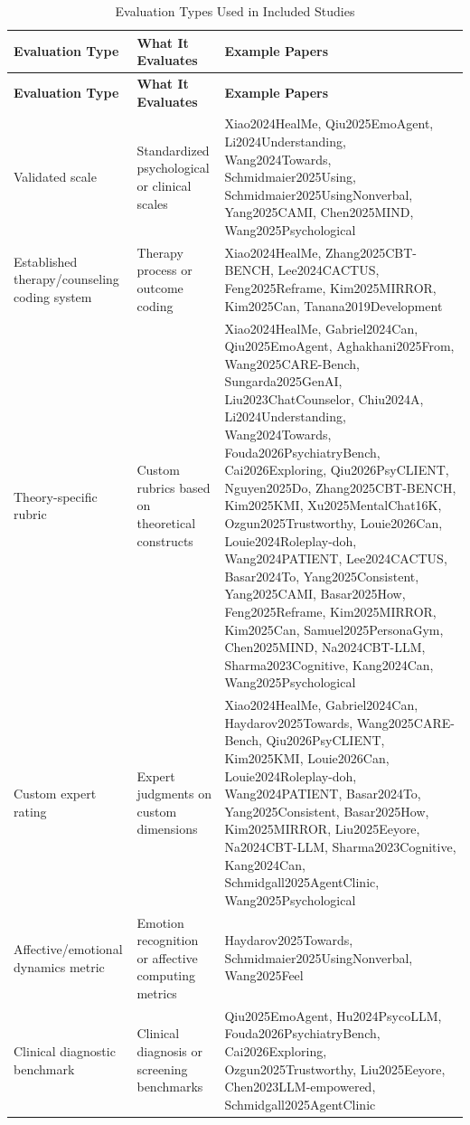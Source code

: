 \begin{longtable}{p{4cm}p{5cm}p{6cm}}
\caption{Evaluation Types Used in Included Studies}
\label{tab:eval-types} \\
\toprule
\textbf{Evaluation Type} & \textbf{What It Evaluates} & \textbf{Example Papers} \\
\midrule
\endfirsthead

\toprule
\textbf{Evaluation Type} & \textbf{What It Evaluates} & \textbf{Example Papers} \\
\midrule
\endhead

\bottomrule
\endfoot
\hyphenpenalty=10000\exhyphenpenalty=10000\tolerance=10000\raggedright
Validated scale & Standardized psychological or clinical scales & Xiao2024HealMe, Qiu2025EmoAgent, Li2024Understanding, Wang2024Towards, Schmidmaier2025Using, Schmidmaier2025UsingNonverbal, Yang2025CAMI, Chen2025MIND, Wang2025Psychological \\
Established therapy/counseling coding system & Therapy process or outcome coding & Xiao2024HealMe, Zhang2025CBT-BENCH, Lee2024CACTUS, Feng2025Reframe, Kim2025MIRROR, Kim2025Can, Tanana2019Development \\
Theory-specific rubric & Custom rubrics based on theoretical constructs & Xiao2024HealMe, Gabriel2024Can, Qiu2025EmoAgent, Aghakhani2025From, Wang2025CARE-Bench, Sungarda2025GenAI, Liu2023ChatCounselor, Chiu2024A, Li2024Understanding, Wang2024Towards, Fouda2026PsychiatryBench, Cai2026Exploring, Qiu2026PsyCLIENT, Nguyen2025Do, Zhang2025CBT-BENCH, Kim2025KMI, Xu2025MentalChat16K, Ozgun2025Trustworthy, Louie2026Can, Louie2024Roleplay-doh, Wang2024PATIENT, Lee2024CACTUS, Basar2024To, Yang2025Consistent, Yang2025CAMI, Basar2025How, Feng2025Reframe, Kim2025MIRROR, Kim2025Can, Samuel2025PersonaGym, Chen2025MIND, Na2024CBT-LLM, Sharma2023Cognitive, Kang2024Can, Wang2025Psychological \\
Custom expert rating & Expert judgments on custom dimensions & Xiao2024HealMe, Gabriel2024Can, Haydarov2025Towards, Wang2025CARE-Bench, Qiu2026PsyCLIENT, Kim2025KMI, Louie2026Can, Louie2024Roleplay-doh, Wang2024PATIENT, Basar2024To, Yang2025Consistent, Basar2025How, Kim2025MIRROR, Liu2025Eeyore, Na2024CBT-LLM, Sharma2023Cognitive, Kang2024Can, Schmidgall2025AgentClinic, Wang2025Psychological \\
Affective/emotional dynamics metric & Emotion recognition or affective computing metrics & Haydarov2025Towards, Schmidmaier2025UsingNonverbal, Wang2025Feel \\
Clinical diagnostic benchmark & Clinical diagnosis or screening benchmarks & Qiu2025EmoAgent, Hu2024PsycoLLM, Fouda2026PsychiatryBench, Cai2026Exploring, Ozgun2025Trustworthy, Liu2025Eeyore, Chen2023LLM-empowered, Schmidgall2025AgentClinic \\

\end{longtable}
